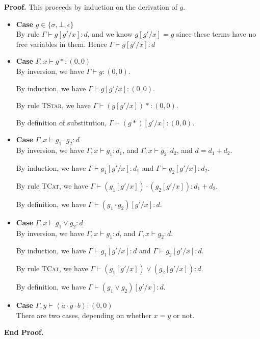 \documentclass{article}
\newcommand{\lft}[1]{\left<{#1}\right.}
\newcommand{\rgt}[1]{\left.{#1}\right>}
\newcommand{\judgebalance}[3][\Gamma]{{#1} \vdash {#2} : {#3}}
\newcommand{\zero}{(0,0)}
\newenvironment{proof}{\noindent\textbf{Proof.}}{\noindent\textbf{End Proof.}}
\newenvironment{caseblock}{\begin{itemize}}{\end{itemize}}
\newenvironment{case}[1]{\item \textbf{Case} {#1}\\}{}
\begin{document}
\begin{proof}
  This proceeds by induction on the derivation of $g$. 

  \begin{caseblock}
    \begin{case}{$g \in \{\sigma, \bot, \epsilon\}$}
      By rule $\judgebalance{g[g'/x]}{d}$, and we know $g[g'/x] = g$ since
      these terms have no free variables in them. 
      Hence $\judgebalance{g[g'/x]}{d}$
    \end{case}

    \begin{case}{$\judgebalance[\Gamma,x]{g*}{\zero}$}
      By inversion, we have $\judgebalance{g}{\zero}$. 

      By induction, we have $\judgebalance{g[g'/x]}{\zero}$.

      By rule \textsc{TStar}, we have $\judgebalance{(g[g'/x])*}{\zero}$. 

      By definition of substitution, $\judgebalance{(g*)[g'/x]}{\zero}$. 
    \end{case}

    \begin{case}{$\judgebalance[\Gamma, x]{g_1\cdot g_2}{d}$}
      By inversion, we have $\judgebalance[\Gamma, x]{g_1}{d_1}$, and
        $\judgebalance[\Gamma, x]{g_2}{d_2}$, and $d = d_1 + d_2$. 
      
      By induction, we have $\judgebalance{g_1[g'/x]}{d_1}$ and 
      $\judgebalance{g_2[g'/x]}{d_2}$. 

      By rule \textsc{TCat}, we have $\judgebalance{(g_1[g'/x])\cdot(g_2[g'/x])}{d_1 + d_2}$. 
      
      By definition, we have $\judgebalance{(g_1\cdot g_2)[g'/x]}{d}$. 
    \end{case}

    \begin{case}{$\judgebalance[\Gamma, x]{g_1\vee g_2}{d}$}
      By inversion, we have $\judgebalance[\Gamma, x]{g_1}{d}$, and
        $\judgebalance[\Gamma, x]{g_2}{d}$.
      
      By induction, we have $\judgebalance{g_1[g'/x]}{d}$ and 
      $\judgebalance{g_2[g'/x]}{d}$. 

      By rule \textsc{TCat}, we have $\judgebalance{(g_1[g'/x])\vee(g_2[g'/x])}{d}$. 
      
      By definition, we have $\judgebalance{(g_1\vee g_2)[g'/x]}{d}$. 
    \end{case}
    
    \begin{case}{$\judgebalance[\Gamma, y]{\lft{a}\cdot y \cdot\rgt{b}}{\zero}$}
      There are two cases, depending on whether $x = y$ or not. 


\end{case}
\end{caseblock}
\end{proof}
\end{document}
